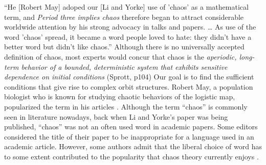 \documentclass[12pt,twoside]{book}
\begin{document}
``He [Robert May] adoped our [Li and Yorke] use of 'chaos' as a mathematical term, and \textit{Period three implies chaos} therefore began to attract considerable worldwide attention by his strong advocacy in talks and papers.
\ldots
As use of the word 'chaos' spread, it became a word people loved to hate: they didn't have a better word but didn't like chaos.''
\citep[205]{ueda-abraham}
Although there is no universally accepted definition of chaos, most experts would concur that chaos is the {\it aperiodic, long-term behavior of a bounded, deterministic system that exhibits sensitive dependence on initial conditions} (Sprott, p104)
Our goal is to find the sufficient conditions that give rise to complex orbit structures.
Robert May, a population biologist who is known for studying chaotic behaviors of the logistic map, popularized the term in his articles \citeyearpar{may1,may2}.
Although the term ``chaos'' is commonly seen in literature nowadays, back when Li and Yorke's paper was being published, ``chaos'' was not an often used word in academic papers.
Some editors considered the title of their paper to be inappropriate for a language used in an academic article.
However, some authors admit that the liberal choice of word has to some extent contributed to the popularity that chaos theory currently enjoys \citep[``Exploring Chaos on an Interval'']{ueda-abraham}.
\end{document}
